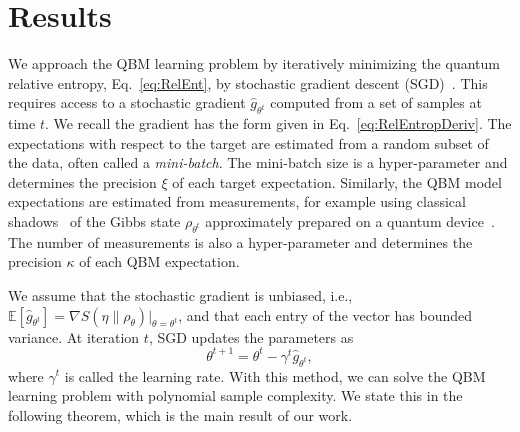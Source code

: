 \documentclass[
    aps,
    prx,
    floatfix,
    nofootinbib,
    onecolumn
]{revtex4-2}
\begin{document}
\section*{Results}

We approach the QBM learning problem by iteratively minimizing the quantum relative entropy,  Eq.~\eqref{eq:RelEnt}, by stochastic gradient descent (SGD)~\cite{Garrigos2023}. This requires access to a stochastic gradient $\hat{g}_{\theta^t}$ computed from a set of samples at time $t$. We recall the gradient has the form given in Eq.~\eqref{eq:RelEntropDeriv}. The expectations with respect to the target are estimated from a random subset of the data, often called a \emph{mini-batch}. The mini-batch size is a hyper-parameter and determines the precision $\xi$ of each target expectation. Similarly, the QBM model expectations are estimated from measurements, for example using classical shadows~\cite{Aaronson_2017, Huang_2021} of the Gibbs state $\rho_{\theta^t}$ approximately prepared on a quantum device~\cite{Coopmans_2023}. The number of measurements is also a hyper-parameter and determines the precision $\kappa$ of each QBM expectation.

We assume that the stochastic gradient is unbiased, i.e., $\mathbb{E}[\hat{g}_{\theta^t}] = \nabla S(\eta \|\rho_\theta)|_{\theta = \theta^t}$, and that each entry of the vector has bounded variance. At iteration $t$, SGD updates the parameters as 
\begin{equation}
\label{eq:sgd_update}
    \theta^{t+1} = \theta^{t} - \gamma^{t} \hat{g}_{\theta^{t}},
\end{equation} 
where $\gamma^t$ is called the learning rate. With this method, we can solve the QBM learning problem with polynomial sample complexity. We state this in the following theorem, which is the main result of our work. 
\end{document}
